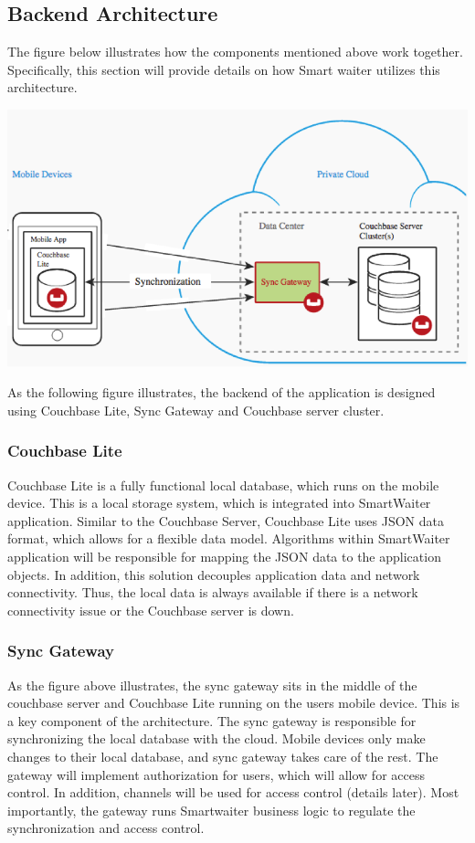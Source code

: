 \documentclass[12pt, titlepage]{article}
\begin{document}
\subsection{Backend Architecture}

The figure below illustrates how the components mentioned above work together. Specifically, this section will provide details on how Smart waiter utilizes this architecture.

\includegraphics[width=150mm,scale=0.5]{couchbase.png}

As the following figure illustrates, the backend of the application is designed using Couchbase Lite, Sync Gateway and Couchbase server cluster.

\subsubsection{Couchbase Lite}
Couchbase Lite is a fully functional local database, which runs on the mobile device. This is a local storage system, which is integrated into SmartWaiter application.  Similar to the Couchbase Server, Couchbase Lite uses JSON data format, which allows for a flexible data model. Algorithms within SmartWaiter application will be responsible for mapping the JSON data to the application objects. In addition, this solution decouples application data and network connectivity. Thus, the local data is always available if there is a network connectivity issue or the Couchbase server is down. 

\subsubsection{Sync Gateway}
As the figure above illustrates, the sync gateway sits in the middle of the couchbase server and Couchbase Lite running on the users mobile device. This is a key component of the architecture. The sync gateway is responsible for synchronizing the local database with the cloud. Mobile devices only make changes to their local database, and sync gateway takes care of the rest.  The gateway will implement authorization for users, which will allow for access control. In addition, channels will be used for access control (details later). Most importantly, the gateway runs Smartwaiter business logic to regulate the synchronization and access control.
\end{document}
